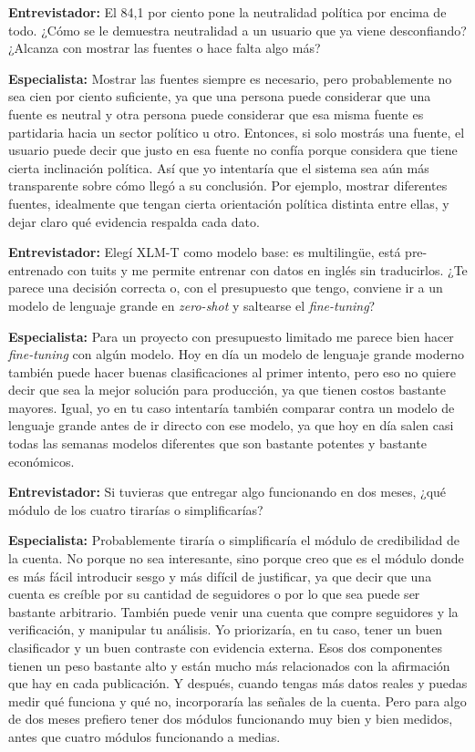 \medskip

\noindent\textbf{Entrevistador:} El 84,1 por ciento pone la neutralidad política por encima de todo. ¿Cómo se le demuestra neutralidad a un usuario que ya viene desconfiando? ¿Alcanza con mostrar las fuentes o hace falta algo más?

\noindent\textbf{Especialista:} Mostrar las fuentes siempre es necesario, pero probablemente no sea cien por ciento suficiente, ya que una persona puede considerar que una fuente es neutral y otra persona puede considerar que esa misma fuente es partidaria hacia un sector político u otro. Entonces, si solo mostrás una fuente, el usuario puede decir que justo en esa fuente no confía porque considera que tiene cierta inclinación política. Así que yo intentaría que el sistema sea aún más transparente sobre cómo llegó a su conclusión. Por ejemplo, mostrar diferentes fuentes, idealmente que tengan cierta orientación política distinta entre ellas, y dejar claro qué evidencia respalda cada dato.

\medskip

\noindent\textbf{Entrevistador:} Elegí XLM-T como modelo base: es multilingüe, está pre-entrenado con tuits y me permite entrenar con datos en inglés sin traducirlos. ¿Te parece una decisión correcta o, con el presupuesto que tengo, conviene ir a un modelo de lenguaje grande en \emph{zero-shot} y saltearse el \emph{fine-tuning}?

\noindent\textbf{Especialista:} Para un proyecto con presupuesto limitado me parece bien hacer \emph{fine-tuning} con algún modelo. Hoy en día un modelo de lenguaje grande moderno también puede hacer buenas clasificaciones al primer intento, pero eso no quiere decir que sea la mejor solución para producción, ya que tienen costos bastante mayores. Igual, yo en tu caso intentaría también comparar contra un modelo de lenguaje grande antes de ir directo con ese modelo, ya que hoy en día salen casi todas las semanas modelos diferentes que son bastante potentes y bastante económicos.

\medskip

\noindent\textbf{Entrevistador:} Si tuvieras que entregar algo funcionando en dos meses, ¿qué módulo de los cuatro tirarías o simplificarías?

\noindent\textbf{Especialista:} Probablemente tiraría o simplificaría el módulo de credibilidad de la cuenta. No porque no sea interesante, sino porque creo que es el módulo donde es más fácil introducir sesgo y más difícil de justificar, ya que decir que una cuenta es creíble por su cantidad de seguidores o por lo que sea puede ser bastante arbitrario. También puede venir una cuenta que compre seguidores y la verificación, y manipular tu análisis. Yo priorizaría, en tu caso, tener un buen clasificador y un buen contraste con evidencia externa. Esos dos componentes tienen un peso bastante alto y están mucho más relacionados con la afirmación que hay en cada publicación. Y después, cuando tengas más datos reales y puedas medir qué funciona y qué no, incorporaría las señales de la cuenta. Pero para algo de dos meses prefiero tener dos módulos funcionando muy bien y bien medidos, antes que cuatro módulos funcionando a medias.

